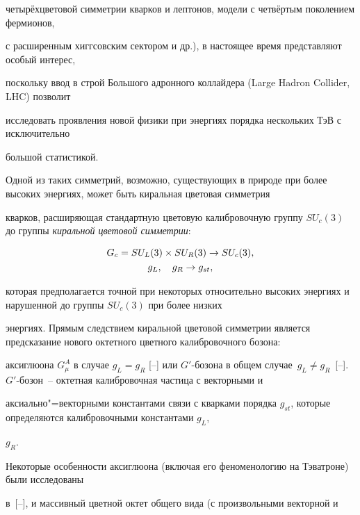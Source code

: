 четырёхцветовой симметрии кварков и лептонов, модели с четвёртым поколением фермионов,

с расширенным хиггсовским сектором и др.), в настоящее время представляют особый интерес,

поскольку ввод в строй Большого адронного коллайдера (Large Hadron Collider, LHC) позволит

исследовать проявления новой физики при энергиях порядка нескольких ТэВ с исключительно

большой статистикой.



Одной из таких симметрий, возможно, существующих в природе при более высоких энергиях, может быть киральная цветовая симметрия

кварков, расширяющая стандартную цветовую калибровочную группу $SU_c(3)$ до группы \textit{киральной цветовой симметрии\/}:

\begin{gather}

\label{march:chiral_group}

G_c = SU_L(3) \times SU_R(3)  \to  SU_c(3), \\

\notag g_L, \quad g_R \to g_{st},

\end{gather}

которая предполагается точной при некоторых относительно высоких энергиях и нарушенной до группы $SU_c(3)$ при более низких

энергиях. Прямым следствием киральной цветовой симметрии является предсказание нового октетного цветного калибровочного бозона:

аксиглюона $G^A_\mu$ в случае $g_L=g_R$ [--] или  $G'$-бозона в общем случае~$g_L\neq

g_R$~[--]. $G'$-бозон~-- октетная калибровочная частица с векторными и

аксиально"=векторными константами связи с кварками порядка $g_{st}$, которые определяются калибровочными константами $g_L$,

$g_R$.



Некоторые особенности аксиглюона (включая его феноменологию на Тэватроне) были исследованы

в~[--], и массивный цветной октет общего вида (с произвольными векторной и

